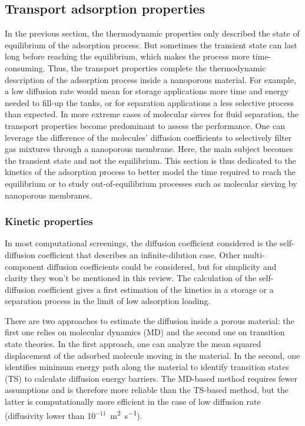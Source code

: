 \documentclass[main.tex]{subfiles}
\begin{document}
\subsection{Transport adsorption properties}

In the previous section, the thermodynamic properties only described the state of equilibrium of the adsorption process. But sometimes the transient state can last long before reaching the equilibrium, which makes the process more time-consuming. Thus, the transport properties complete the thermodynamic description of the adsorption process inside a nanoporous material. For example, a low diffusion rate would mean for storage applications more time and energy needed to fill-up the tanks, or for separation applications a less selective process than expected. In more extreme cases of molecular sieves for fluid separation, the transport properties become predominant to assess the performance. One can leverage the difference of the molecules' diffusion coefficients to selectively filter gas mixtures through a nanoporous membrane.\cite{Miandoab_2021} Here, the main subject becomes the transient state and not the equilibrium. This section is thus dedicated to the kinetics of the adsorption process to better model the time required to reach the equilibrium or to study out-of-equilibrium processes such as molecular sieving by nanoporous membranes.

\subsubsection{Kinetic properties}

In most computational screenings, the diffusion coefficient considered is the self-diffusion coefficient that describes an infinite-dilution case. Other multi-component diffusion coefficients could be considered, but for simplicity and clarity they won't be mentioned in this review. The calculation of the self-diffusion coefficient gives a first estimation of the kinetics in a storage or a separation process in the limit of low adsorption loading.

There are two approaches to estimate the diffusion inside a porous material: the first one relies on molecular dynamics (MD) and the second one on transition state theories. In the first approach, one can analyze the mean squared displacement of the adsorbed molecule moving in the material. In the second, one identifies minimum energy path along the material to identify transition states (TS) to calculate diffusion energy barriers. The MD-based method requires fewer assumptions and is therefore more reliable than the TS-based method, but the latter is computationally more efficient in the case of low diffusion rate (diffusivity lower than 10$^{-11}$~\si{\square\meter\per\second}).
\end{document}
